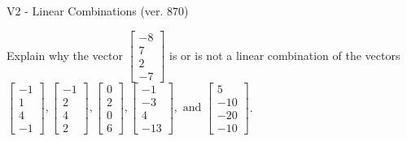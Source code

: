 \begin{exercise}
  \begin{exerciseTitle}V2 - Linear Combinations (ver. 870)\end{exerciseTitle}
  \begin{exerciseStatement}
    Explain why the vector \(\left[\begin{array}{c}
-8 \\
7 \\
2 \\
-7
\end{array}\right]\)  is or is not a linear 
	combination of the vectors \(\left[\begin{array}{c}
-1 \\
1 \\
4 \\
-1
\end{array}\right] , \left[\begin{array}{c}
-1 \\
2 \\
4 \\
2
\end{array}\right] , \left[\begin{array}{c}
0 \\
2 \\
0 \\
6
\end{array}\right] , \left[\begin{array}{c}
-1 \\
-3 \\
4 \\
-13
\end{array}\right] , \text{ and } \left[\begin{array}{c}
5 \\
-10 \\
-20 \\
-10
\end{array}\right]\).
	



\end{exerciseStatement}
\end{exercise}
